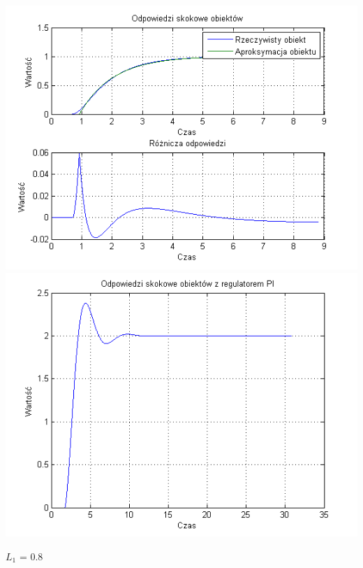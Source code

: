 \documentclass[10pt,a4paper]{article}
\begin{document}
\begin{center}
\includegraphics[scale=1]{images/jeden/skrypt_165.png}\\
\includegraphics[scale=1]{images/jeden/skrypt_166.png}\\
\end{center}
\newpage
$L_1$ = 0.8
\end{document}
